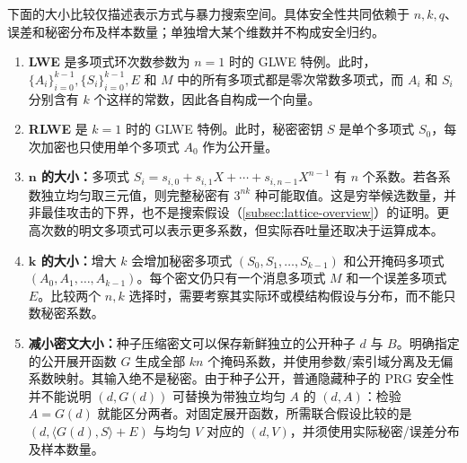 下面的大小比较仅描述表示方式与暴力搜索空间。具体安全性共同依赖于 $n,k,q$、误差和秘密分布及样本数量；单独增大某个维数并不构成安全归约。
\begin{enumerate}
\item \textbf{LWE} 是多项式环次数参数为 $n = 1$ 时的 GLWE 特例。此时，$\{A_i\}_{i=0}^{k-1}, \{S_i\}_{i=0}^{k-1}, E$ 和 $M$ 中的所有多项式都是零次常数多项式，而 $A_i$ 和 $S_i$ 分别含有 $k$ 个这样的常数，因此各自构成一个向量。
\item \textbf{RLWE} 是 $k = 1$ 时的 GLWE 特例。此时，秘密密钥 $S$ 是单个多项式 $S_0$，每次加密也只使用单个多项式 $A_0$ 作为公开量。
\item \textbf{$\bm{n}$ 的大小：}多项式 $S_i = s_{i,0} + s_{i,1}X + \cdots + s_{i, n-1}X^{n-1} $ 有 $n$ 个系数。若各系数独立均匀取三元值，则完整秘密有 $3^{nk}$ 种可能取值。这是穷举候选数量，并非最佳攻击的下界，也不是搜索假设（\autoref{subsec:lattice-overview}）的证明。更高次数的明文多项式可以表示更多系数，但实际吞吐量还取决于运算成本。
\item \textbf{$\bm{k}$ 的大小：}增大 $k$ 会增加秘密多项式 $(S_0, S_1, \ldots, S_{k-1})$ 和公开掩码多项式 $(A_0, A_1,\ldots, A_{k-1})$。每个密文仍只有一个消息多项式 $M$ 和一个误差多项式 $E$。比较两个 $n,k$ 选择时，需要考察其实际环或模结构假设与分布，而不能只数秘密系数。
\item \textbf{减小密文大小：}种子压缩密文可以保存新鲜独立的公开种子 $d$ 与 $B$。明确指定的公开展开函数 $G$ 生成全部 $kn$ 个掩码系数，并使用参数/索引域分离及无偏系数映射。其输入绝不是秘密。由于种子公开，普通隐藏种子的 PRG 安全性并不能说明 $(d,G(d))$ 可替换为带独立均匀 $A$ 的 $(d,A)$：检验 $A=G(d)$ 就能区分两者。对固定展开函数，所需联合假设比较的是 $(d,\langle G(d),S\rangle+E)$ 与均匀 $V$ 对应的 $(d,V)$，并须使用实际秘密/误差分布及样本数量。
\end{enumerate}

